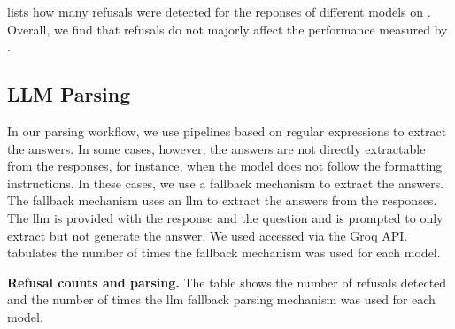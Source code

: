  lists how many refusals were detected for the reponses of different models on \chembench. Overall, we find that refusals do not majorly affect the performance measured by \chembench.


\subsection{LLM Parsing} \label{sec:llm-parsing}

In our parsing workflow, we use pipelines based on regular expressions to extract the answers. In some cases, however, the answers are not directly extractable from the responses, for instance, when the model does not follow the formatting instructions. In these cases, we use a fallback mechanism to extract the answers. The fallback mechanism uses an \gls{llm} to extract the answers from the responses. The \gls{llm} is provided with the response and the question and is prompted to only extract but not generate the answer. We used \LlamaThreeSeventyBInstruct accessed via the Groq API.
 tabulates the number of times the fallback mechanism was used for each model.


\begin{table}
    \centering
    \caption{\textbf{Refusal counts and parsing.} The table shows the number of refusals detected and the number of times the \gls{llm} fallback parsing mechanism was used for each model.}
    \label{tab:refusal_counts_and_parsing}
\end{table}

\clearpage
